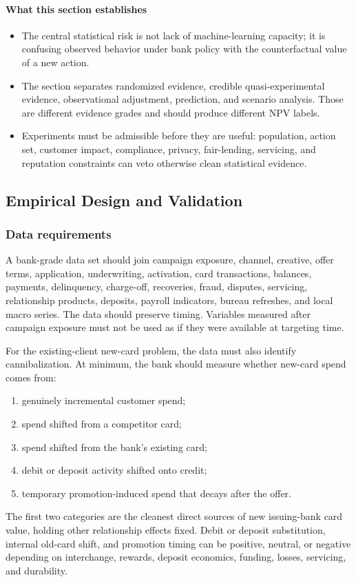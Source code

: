 \documentclass[11pt]{article}
\newcommand{\1}{\mathbf{1}}
\newcommand{\readerbox}[2]{\paragraph{#1}\begin{itemize}[leftmargin=1.5em,itemsep=0.1em,topsep=0.15em]#2\end{itemize}}
\begin{document}
\readerbox{What this section establishes}{
  \item The central statistical risk is not lack of machine-learning capacity;
        it is confusing observed behavior under bank policy with the
        counterfactual value of a new action.
  \item The section separates randomized evidence, credible quasi-experimental
        evidence, observational adjustment, prediction, and scenario analysis.
        Those are different evidence grades and should produce different NPV
        labels.
  \item Experiments must be admissible before they are useful: population,
        action set, customer impact, compliance, privacy, fair-lending,
        servicing, and reputation constraints can veto otherwise clean
        statistical evidence.
}

\subsection{Empirical Design and Validation}
\label{sec:validation}

\subsubsection{Data requirements}

A bank-grade data set should join campaign exposure, channel, creative, offer
terms, application, underwriting, activation, card transactions, balances,
payments, delinquency, charge-off, recoveries, fraud, disputes, servicing,
relationship products, deposits, payroll indicators, bureau refreshes, and
local macro series. The data should preserve timing. Variables measured after
campaign exposure must not be used as if they were available at targeting time.

For the existing-client new-card problem, the data must also identify
cannibalization. At minimum, the bank should measure whether new-card spend
comes from:
\begin{enumerate}[label=\alph*.]
  \item genuinely incremental customer spend;
  \item spend shifted from a competitor card;
  \item spend shifted from the bank's existing card;
  \item debit or deposit activity shifted onto credit;
  \item temporary promotion-induced spend that decays after the offer.
\end{enumerate}
The first two categories are the cleanest direct sources of new issuing-bank
card value, holding other relationship effects fixed. Debit or deposit
substitution, internal old-card shift, and promotion timing can be positive,
neutral, or negative depending on interchange, rewards, deposit economics,
funding, losses, servicing, and durability.
\end{document}
